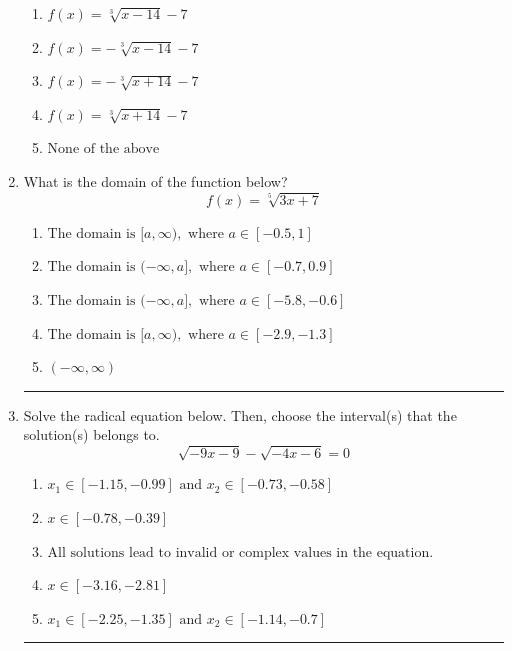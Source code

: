 \documentclass[14pt]{extbook}
\newcommand{\litem}[1]{\item#1\hspace*{-1cm}\rule{\textwidth}{0.4pt}}
\begin{document}
\begin{enumerate}
{\begin{center}
\end{center}
\begin{enumerate}[label=\Alph*.]
\item \( f(x) = \sqrt[3]{x - 14} - 7 \)
\item \( f(x) = - \sqrt[3]{x - 14} - 7 \)
\item \( f(x) = - \sqrt[3]{x + 14} - 7 \)
\item \( f(x) = \sqrt[3]{x + 14} - 7 \)
\item \( \text{None of the above} \)

\end{enumerate} }
\litem{
What is the domain of the function below?\[ f(x) = \sqrt[5]{3 x + 7} \]\begin{enumerate}[label=\Alph*.]
\item \( \text{The domain is } [a, \infty), \text{   where } a \in [-0.5, 1] \)
\item \( \text{The domain is } (-\infty, a], \text{   where } a \in [-0.7, 0.9] \)
\item \( \text{The domain is } (-\infty, a], \text{   where } a \in [-5.8, -0.6] \)
\item \( \text{The domain is } [a, \infty), \text{   where } a \in [-2.9, -1.3] \)
\item \( (-\infty, \infty) \)

\end{enumerate} }
\litem{
Solve the radical equation below. Then, choose the interval(s) that the solution(s) belongs to.\[ \sqrt{-9 x - 9} - \sqrt{-4 x - 6} = 0 \]\begin{enumerate}[label=\Alph*.]
\item \( x_1 \in [-1.15, -0.99] \text{ and } x_2 \in [-0.73,-0.58] \)
\item \( x \in [-0.78,-0.39] \)
\item \( \text{All solutions lead to invalid or complex values in the equation.} \)
\item \( x \in [-3.16,-2.81] \)
\item \( x_1 \in [-2.25, -1.35] \text{ and } x_2 \in [-1.14,-0.7] \)

\end{enumerate} }
\end{enumerate}
\end{document}
